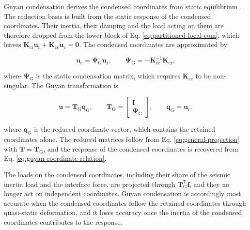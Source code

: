 \documentclass[a4paper,fleqn,review,12pt]{cas-sc}
\numberwithin{equation}{section}
\begin{document}
Guyan condensation derives the condensed coordinates from static equilibrium \cite{Guyan1965}. The reduction basis is built from the static response of the condensed coordinates. Their inertia, their damping and the load acting on them are therefore dropped from the lower block of Eq. \eqref{eq:partitioned-local-eom}, which leaves \(\mathbf{K}_{\mathrm{cr}}\bm{u}_{\mathrm{r}}+\mathbf{K}_{\mathrm{cc}}\bm{u}_{\mathrm{c}}=\bm{0}\). The condensed coordinates are approximated by

\begin{equation}
	\bm{u}_{\mathrm{c}}=\bm{\Psi}_{\mathrm{G}}\bm{u}_{\mathrm{r}},
	\qquad
	\bm{\Psi}_{\mathrm{G}}=-\mathbf{K}_{\mathrm{cc}}^{-1}\mathbf{K}_{\mathrm{cr}},
	\label{eq:guyan-coordinate-relation}
\end{equation}

\noindent where \(\bm{\Psi}_{\mathrm{G}}\) is the static condensation matrix, which requires \(\mathbf{K}_{\mathrm{cc}}\) to be non-singular.
The Guyan transformation is

\begin{equation}
	\bm{u}=\mathbf{T}_{\mathrm{G}}\bm{q}_{\mathrm{G}},
	\qquad
	\mathbf{T}_{\mathrm{G}}=
	\begin{bmatrix}
		\mathbf{I}\\
		\bm{\Psi}_{\mathrm{G}}
	\end{bmatrix},
	\qquad
	\bm{q}_{\mathrm{G}}=\bm{u}_{\mathrm{r}},
	\label{eq:guyan-transformation}
\end{equation}

\noindent where \(\bm{q}_{\mathrm{G}}\) is the reduced coordinate vector, which contains the retained coordinates alone. The reduced matrices follow from Eq. \eqref{eq:general-projection} with \(\mathbf{T}=\mathbf{T}_{\mathrm{G}}\), and the response of the condensed coordinates is recovered from Eq. \eqref{eq:guyan-coordinate-relation}.

The loads on the condensed coordinates, including their share of the seismic inertia load and the interface force, are projected through \(\mathbf{T}_{\mathrm{G}}^{\mathsf{T}}\bm{f}\), and they no longer act on independent coordinates. Guyan condensation is accordingly most accurate when the condensed coordinates follow the retained coordinates through quasi-static deformation, and it loses accuracy once the inertia of the condensed coordinates contributes to the response.
\end{document}

